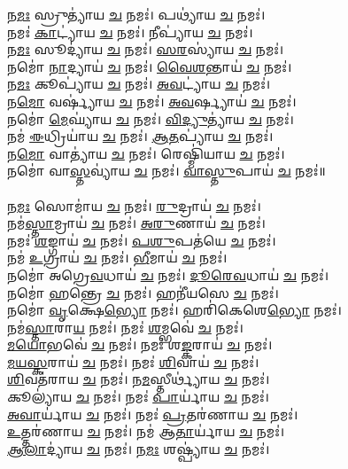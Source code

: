 𑌨\ul{𑌮𑌃} 𑌸𑍍𑌰𑍁𑌤𑍍𑌯𑌾॑𑌯 \ul{𑌚} 𑌨𑌮𑌃॑। 𑌪𑌥𑍍𑌯𑌾॑𑌯 \ul{𑌚} 𑌨𑌮𑌃॑। \\
𑌨𑌮𑌃॑ \ul{𑌕𑌾}𑌟𑍍𑌯𑌾॑𑌯 \ul{𑌚} 𑌨𑌮𑌃॑। \ul{𑌨𑍀}𑌪𑍍𑌯𑌾॑𑌯 \ul{𑌚} 𑌨𑌮𑌃॑।\\
𑌨\ul{𑌮𑌃} 𑌸𑍂𑌦𑍍𑌯𑌾॑𑌯 \ul{𑌚} 𑌨𑌮𑌃॑। \ul{𑌸}\ul{𑌰}𑌸𑍍𑌯𑌾॑𑌯 \ul{𑌚} 𑌨𑌮𑌃॑। \\
𑌨𑌮𑍋॑ \ul{𑌨𑌾}𑌦𑍍𑌯𑌾𑌯॑ \ul{𑌚} 𑌨𑌮𑌃॑। \ul{𑌵𑍈}\ul{𑌶}𑌨𑍍𑌤𑌾𑌯॑ \ul{𑌚} 𑌨𑌮𑌃॑।  \\
𑌨\ul{𑌮𑌃} 𑌕𑍂𑌪𑍍𑌯𑌾॑𑌯 \ul{𑌚} 𑌨𑌮𑌃॑। \ul{𑌅}\ul{𑌵}𑌟𑍍𑌯𑌾॑𑌯 \ul{𑌚} 𑌨𑌮𑌃॑। \\
𑌨\ul{𑌮𑍋} 𑌵𑌰𑍍𑌷𑍍𑌯𑌾॑𑌯 \ul{𑌚} 𑌨𑌮𑌃॑। \ul{𑌅}\ul{𑌵}𑌰𑍍𑌷𑍍𑌯𑌾𑌯॑ \ul{𑌚} 𑌨𑌮𑌃॑। \\
𑌨𑌮𑍋॑ \ul{𑌮𑍇}𑌘𑍍𑌯𑌾॑𑌯 \ul{𑌚} 𑌨𑌮𑌃॑। \ul{𑌵𑌿}\ul{𑌦𑍍𑌯𑍁}𑌤𑍍𑌯𑌾॑𑌯 \ul{𑌚} 𑌨𑌮𑌃॑।\\
𑌨𑌮॑ \ul{𑌈}𑌧𑍍𑌰𑌿𑌯𑌾॑𑌯 \ul{𑌚} 𑌨𑌮𑌃॑। \ul{𑌆}\ul{𑌤}𑌪𑍍𑌯𑌾॑𑌯 \ul{𑌚} 𑌨𑌮𑌃॑।\\
𑌨\ul{𑌮𑍋} 𑌵𑌾𑌤𑍍𑌯𑌾॑𑌯 \ul{𑌚} 𑌨𑌮𑌃॑। 𑌰𑍇𑌷𑍍𑌮𑌿॑𑌯𑌾𑌯 \ul{𑌚} 𑌨𑌮𑌃॑। \\
𑌨𑌮𑍋॑ 𑌵𑌾\ul{𑌸𑍍𑌤}𑌵𑍍𑌯𑌾॑𑌯 \ul{𑌚} 𑌨𑌮𑌃॑। \ul{𑌵𑌾}\ul{𑌸𑍍𑌤𑍁}𑌪𑌾𑌯॑ \ul{𑌚} 𑌨𑌮𑌃॑॥ \\
\\
𑌨\ul{𑌮𑌃} 𑌸𑍋𑌮𑌾॑𑌯 \ul{𑌚} 𑌨𑌮𑌃॑। \ul{𑌰𑍁}𑌦𑍍𑌰𑌾𑌯॑ \ul{𑌚} 𑌨𑌮𑌃॑। \\
𑌨𑌮॑\ul{𑌸𑍍𑌤𑌾}𑌮𑍍𑌰𑌾𑌯॑ \ul{𑌚} 𑌨𑌮𑌃॑। \ul{𑌅}\ul{𑌰𑍁}𑌣𑌾𑌯॑ \ul{𑌚} 𑌨𑌮𑌃॑।\\
𑌨𑌮𑌃॑ \ul{𑌶}𑌙𑍍𑌗𑌾𑌯॑ \ul{𑌚} 𑌨𑌮𑌃॑। \ul{𑌪}\ul{𑌶𑍁}𑌪𑌤॑𑌯𑍇 \ul{𑌚} 𑌨𑌮𑌃॑। \\
𑌨𑌮॑ \ul{𑌉}𑌗𑍍𑌰𑌾𑌯॑ \ul{𑌚} 𑌨𑌮𑌃॑। \ul{𑌭𑍀}𑌮𑌾𑌯॑ \ul{𑌚} 𑌨𑌮𑌃॑। \\
𑌨𑌮𑍋॑ 𑌅𑌗𑍍𑌰𑍇\ul{𑌵}𑌧𑌾𑌯॑ \ul{𑌚} 𑌨𑌮𑌃॑। \ul{𑌦𑍂}\ul{𑌰𑍇}\ul{𑌵}𑌧𑌾𑌯॑ \ul{𑌚} 𑌨𑌮𑌃॑।\\
𑌨𑌮𑍋॑ \ul{𑌹}𑌨𑍍𑌤𑍍𑌰𑍇 \ul{𑌚} 𑌨𑌮𑌃॑। 𑌹𑌨𑍀॑𑌯𑌸𑍇 \ul{𑌚} 𑌨𑌮𑌃॑। \\
𑌨𑌮𑍋॑ \ul{𑌵𑍃}𑌕𑍍𑌷𑍇\ul{𑌭𑍍𑌯𑍋} 𑌨𑌮𑌃॑। 𑌹𑌰𑌿॑𑌕𑍇𑌶𑍇\ul{𑌭𑍍𑌯𑍋} 𑌨𑌮𑌃॑।\\
𑌨𑌮॑\ul{𑌸𑍍𑌤𑌾}𑌰𑌾\ul{𑌯} 𑌨𑌮𑌃॑। 𑌨𑌮𑌃॑ \ul{𑌶}𑌮𑍍𑌭𑌵𑍇॑ \ul{𑌚} 𑌨𑌮𑌃॑। \\
\ul{𑌮}\ul{𑌯𑍋}𑌭𑌵𑍇॑ \ul{𑌚} 𑌨𑌮𑌃॑। 𑌨𑌮𑌃॑ 𑌶\ul{𑌙𑍍𑌕}𑌰𑌾𑌯॑ \ul{𑌚} 𑌨𑌮𑌃॑। \\
\ul{𑌮}\ul{𑌯}\ul{𑌸𑍍𑌕}𑌰𑌾𑌯॑ \ul{𑌚} 𑌨𑌮𑌃॑। 𑌨𑌮𑌃॑ \ul{𑌶𑌿}𑌵𑌾𑌯॑  \ul{𑌚} 𑌨𑌮𑌃॑। \\
\ul{𑌶𑌿}𑌵𑌤॑𑌰𑌾𑌯 \ul{𑌚} 𑌨𑌮𑌃॑। 𑌨\ul{𑌮}𑌸𑍍𑌤𑍀𑌰𑍍𑌥𑍍𑌯𑌾॑𑌯 \ul{𑌚} 𑌨𑌮𑌃॑। \\
𑌕𑍂𑌲𑍍𑌯𑌾॑𑌯 \ul{𑌚} 𑌨𑌮𑌃॑। 𑌨𑌮𑌃॑ \ul{𑌪𑌾}𑌰𑍍𑌯𑌾॑𑌯 \ul{𑌚} 𑌨𑌮𑌃॑। \\
\ul{𑌅}\ul{𑌵𑌾}𑌰𑍍𑌯𑌾॑𑌯 \ul{𑌚} 𑌨𑌮𑌃॑। 𑌨𑌮𑌃॑ \ul{𑌪𑍍𑌰}𑌤𑌰॑𑌣𑌾𑌯 \ul{𑌚} 𑌨𑌮𑌃॑। \\
\ul{𑌉}𑌤𑍍𑌤𑌰॑𑌣𑌾𑌯 \ul{𑌚} 𑌨𑌮𑌃॑। 𑌨𑌮॑ 𑌆\ul{𑌤𑌾}𑌰𑍍𑌯𑌾॑𑌯 \ul{𑌚} 𑌨𑌮𑌃॑। \\
\ul{𑌆}\ul{𑌲𑌾}𑌦𑍍𑌯𑌾॑𑌯 \ul{𑌚} 𑌨𑌮𑌃॑। 𑌨\ul{𑌮𑌃} 𑌶𑌷𑍍𑌪𑍍𑌯𑌾॑𑌯 \ul{𑌚} 𑌨𑌮𑌃॑। \\
